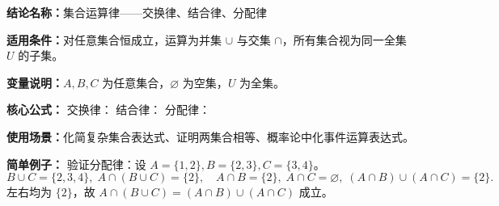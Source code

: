 \textbf{结论名称：}集合运算律——交换律、结合律、分配律

\textbf{适用条件：}对任意集合恒成立，运算为并集 $\cup$ 与交集 $\cap$，所有集合视为同一全集 $U$ 的子集。

\textbf{变量说明：}$A,B,C$ 为任意集合，$\varnothing$ 为空集，$U$ 为全集。

\textbf{核心公式：}
交换律：
结合律：
分配律：

\textbf{使用场景：}化简复杂集合表达式、证明两集合相等、概率论中化事件运算表达式。

\textbf{简单例子：}
验证分配律：设 $A=\{1,2\},B=\{2,3\},C=\{3,4\}$。
\[
B\cup C=\{2,3,4\},\; A\cap(B\cup C)=\{2\},\quad A\cap B=\{2\},\; A\cap C=\varnothing,\; (A\cap B)\cup(A\cap C)=\{2\}.
\]
左右均为 $\{2\}$，故 $A\cap(B\cup C)=(A\cap B)\cup(A\cap C)$ 成立。